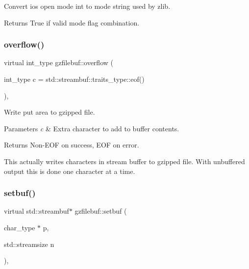Convert ios open mode int to mode string used by zlib. 

\begin{DoxyReturn}{Returns}
True if valid mode flag combination. 
\end{DoxyReturn}
\mbox{\label{classgzfilebuf_aa5c16941b7897bba35349199cbbac2ed}} 
\subsubsection{\texorpdfstring{overflow()}{overflow()}}
{\footnotesize\ttfamily virtual int\+\_\+type gzfilebuf\+::overflow (\begin{DoxyParamCaption}\item[{int\+\_\+type}]{c = {\ttfamily std\+:\+:streambuf\+:\+:traits\+\_\+type\+:\+:eof()} }\end{DoxyParamCaption})\hspace{0.3cm}{\ttfamily [protected]}, {\ttfamily [virtual]}}



Write put area to gzipped file. 


\begin{DoxyParams}{Parameters}
{\em c} & Extra character to add to buffer contents. \\
\hline
\end{DoxyParams}
\begin{DoxyReturn}{Returns}
Non-\/\+E\+OF on success, E\+OF on error.
\end{DoxyReturn}
This actually writes characters in stream buffer to gzipped file. With unbuffered output this is done one character at a time. \mbox{\label{classgzfilebuf_a11ff58ab8f4de52cf496892b3a97827e}} 
\subsubsection{\texorpdfstring{setbuf()}{setbuf()}}
{\footnotesize\ttfamily virtual std\+::streambuf$\ast$ gzfilebuf\+::setbuf (\begin{DoxyParamCaption}\item[{char\+\_\+type $\ast$}]{p,  }\item[{std\+::streamsize}]{n }\end{DoxyParamCaption})\hspace{0.3cm}{\ttfamily [protected]}, {\ttfamily [virtual]}}



